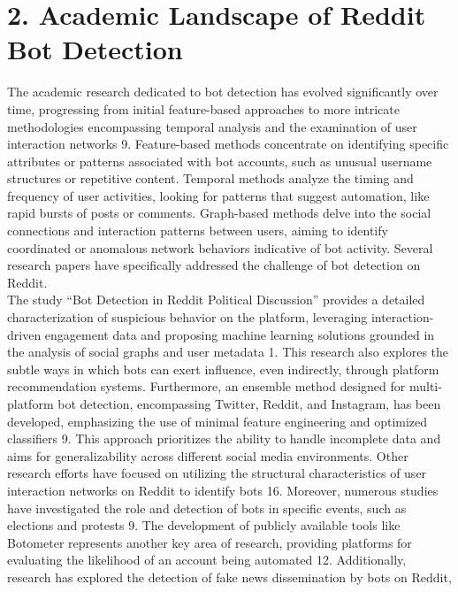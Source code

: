 \documentclass[
  12pt,
  letterpaper,
  DIV=11,
  numbers=noendperiod]{scrartcl}
\begin{document}
\section{\texorpdfstring{\textbf{2. Academic Landscape of Reddit Bot
Detection}}{2. Academic Landscape of Reddit Bot Detection}}\label{academic-landscape-of-reddit-bot-detection}

The academic research dedicated to bot detection has evolved
significantly over time, progressing from initial feature-based
approaches to more intricate methodologies encompassing temporal
analysis and the examination of user interaction networks 9.
Feature-based methods concentrate on identifying specific attributes or
patterns associated with bot accounts, such as unusual username
structures or repetitive content. Temporal methods analyze the timing
and frequency of user activities, looking for patterns that suggest
automation, like rapid bursts of posts or comments. Graph-based methods
delve into the social connections and interaction patterns between
users, aiming to identify coordinated or anomalous network behaviors
indicative of bot activity. Several research papers have specifically
addressed the challenge of bot detection on Reddit.\\
The study ``Bot Detection in Reddit Political Discussion'' provides a
detailed characterization of suspicious behavior on the platform,
leveraging interaction-driven engagement data and proposing machine
learning solutions grounded in the analysis of social graphs and user
metadata 1. This research also explores the subtle ways in which bots
can exert influence, even indirectly, through platform recommendation
systems. Furthermore, an ensemble method designed for multi-platform bot
detection, encompassing Twitter, Reddit, and Instagram, has been
developed, emphasizing the use of minimal feature engineering and
optimized classifiers 9. This approach prioritizes the ability to handle
incomplete data and aims for generalizability across different social
media environments. Other research efforts have focused on utilizing the
structural characteristics of user interaction networks on Reddit to
identify bots 16. Moreover, numerous studies have investigated the role
and detection of bots in specific events, such as elections and protests
9. The development of publicly available tools like Botometer represents
another key area of research, providing platforms for evaluating the
likelihood of an account being automated 12. Additionally, research has
explored the detection of fake news dissemination by bots on Reddit,
\end{document}
